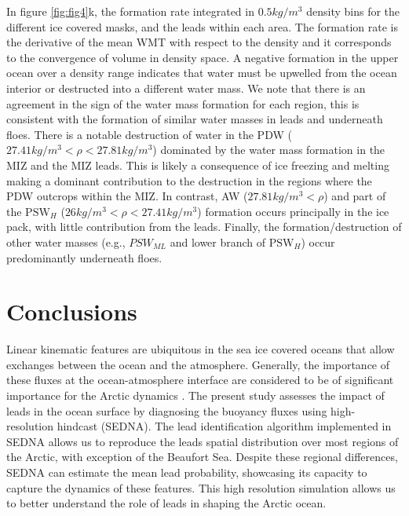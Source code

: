 \documentclass[draft]{agujournal2019}
\begin{document}
In figure \ref{fig:fig4}k, the formation rate integrated in $0.5 kg/m^{3}$ density bins for the different ice covered masks, and the leads within each area. The formation rate is the derivative of the mean WMT with respect to the density and it corresponds to the convergence of volume in density space. A negative formation in the upper ocean over a density range indicates that water must be upwelled from the ocean interior or destructed into a different water mass.  We note that there is an agreement in the sign of the water mass formation for each region, this is consistent with the formation of similar water masses in leads and underneath floes. There is a notable destruction of water in the PDW ($27.41 kg/m^3 < \rho < 27.81 kg/m^3$) dominated by the water mass formation in the MIZ and the MIZ leads. This is likely a consequence of ice freezing and melting making a dominant contribution to the destruction in the regions where the PDW outcrops within the MIZ. In contrast, AW ($27.81 kg/m^3 < \rho $) and part of the $\text{PSW}_H$ ($26 kg/m^3 < \rho < 27.41 kg/m^3$) formation occurs principally in the ice pack, with little contribution from the leads. 
Finally, the formation/destruction of other water masses (e.g., $PSW_{ML}$ and lower branch of $\text{PSW}_H$) occur predominantly underneath floes. 

\section{Conclusions}

Linear kinematic features are ubiquitous in the sea ice covered oceans that allow exchanges between the ocean and the atmosphere. Generally, the importance of these fluxes at the ocean-atmosphere interface are considered to be of significant importance for the Arctic dynamics \citep{Maykut_solar_1995}. The present study assesses the impact of leads in the ocean surface by diagnosing the buoyancy fluxes using high-resolution hindcast (SEDNA). The lead identification algorithm implemented in SEDNA allows us to reproduce the leads spatial distribution over most regions of the Arctic, with exception of the Beaufort Sea. Despite these regional differences, SEDNA can estimate the mean lead probability, showcasing its capacity to capture the dynamics of these features. This high resolution simulation allows us to better understand the role of leads in shaping the Arctic ocean.
\end{document}

